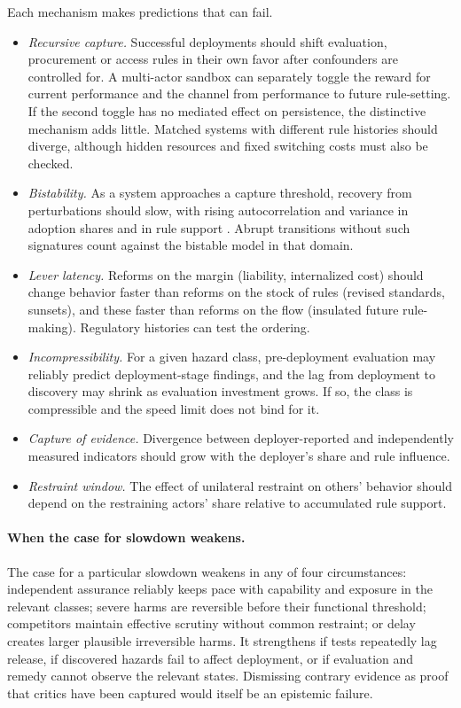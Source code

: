 \documentclass[11pt]{article}
\theoremstyle{plain}
\theoremstyle{definition}
\begin{document}
Each mechanism makes predictions that can fail.
\begin{itemize}[leftmargin=*]
\item \emph{Recursive capture.} Successful deployments should shift evaluation, procurement or access rules in their own favor after confounders are controlled for. A multi-actor sandbox can separately toggle the reward for current performance and the channel from performance to future rule-setting. If the second toggle has no mediated effect on persistence, the distinctive mechanism adds little. Matched systems with different rule histories should diverge, although hidden resources and fixed switching costs must also be checked.
\item \emph{Bistability.} As a system approaches a capture threshold, recovery from perturbations should slow, with rising autocorrelation and variance in adoption shares and in rule support \citep{scheffer2009}. Abrupt transitions without such signatures count against the bistable model in that domain.
\item \emph{Lever latency.} Reforms on the margin (liability, internalized cost) should change behavior faster than reforms on the stock of rules (revised standards, sunsets), and these faster than reforms on the flow (insulated future rule-making). Regulatory histories can test the ordering.
\item \emph{Incompressibility.} For a given hazard class, pre-deployment evaluation may reliably predict deployment-stage findings, and the lag from deployment to discovery may shrink as evaluation investment grows. If so, the class is compressible and the speed limit does not bind for it.
\item \emph{Capture of evidence.} Divergence between deployer-reported and independently measured indicators should grow with the deployer's share and rule influence.
\item \emph{Restraint window.} The effect of unilateral restraint on others' behavior should depend on the restraining actors' share relative to accumulated rule support.
\end{itemize}

\paragraph{When the case for slowdown weakens.} The case for a particular slowdown weakens in any of four circumstances: independent assurance reliably keeps pace with capability and exposure in the relevant classes; severe harms are reversible before their functional threshold; competitors maintain effective scrutiny without common restraint; or delay creates larger plausible irreversible harms. It strengthens if tests repeatedly lag release, if discovered hazards fail to affect deployment, or if evaluation and remedy cannot observe the relevant states. Dismissing contrary evidence as proof that critics have been captured would itself be an epistemic failure.
\end{document}
